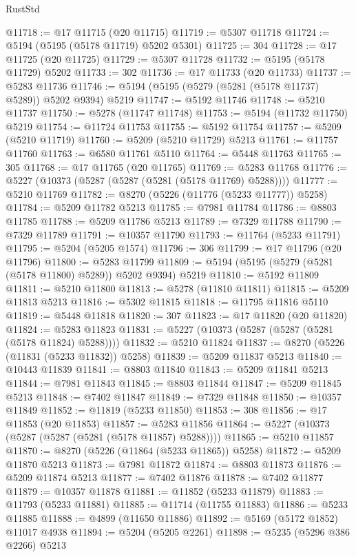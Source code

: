 \begin{lexlean}{RustStd}
\begin{coremodule}
@11718 := @17 @11715 (@20 @11715)
@11719 := @5307 @11718
@11724 := @5194 (@5195 (@5178 @11719) @5202 @5301)
@11725 := 304
@11728 := @17 @11725 (@20 @11725)
@11729 := @5307 @11728
@11732 := @5195 (@5178 @11729) @5202
@11733 := 302
@11736 := @17 @11733 (@20 @11733)
@11737 := @5283 @11736
@11746 := @5194 (@5195 (@5279 (@5281 (@5178 @11737) @5289)) @5202 @9394) @5219
@11747 := @5192 @11746
@11748 := @5210 @11737
@11750 := @5278 (@11747 @11748)
@11753 := @5194 (@11732 @11750) @5219
@11754 := @11724 @11753
@11755 := @5192 @11754
@11757 := @5209 (@5210 @11719)
@11760 := @5209 (@5210 @11729) @5213
@11761 := @11757 @11760
@11763 := @6580 @11761 @5110
@11764 := @5448 @11763
@11765 := 305
@11768 := @17 @11765 (@20 @11765)
@11769 := @5283 @11768
@11776 := @5227 (@10373 (@5287 (@5287 (@5281 (@5178 @11769) @5288))))
@11777 := @5210 @11769
@11782 := @8270 (@5226 (@11776 (@5233 @11777)) @5258)
@11784 := @5209 @11782 @5213
@11785 := @7981 @11784
@11786 := @8803 @11785
@11788 := @5209 @11786 @5213
@11789 := @7329 @11788
@11790 := @7329 @11789
@11791 := @10357 @11790
@11793 := @11764 (@5233 @11791)
@11795 := @5204 (@5205 @1574)
@11796 := 306
@11799 := @17 @11796 (@20 @11796)
@11800 := @5283 @11799
@11809 := @5194 (@5195 (@5279 (@5281 (@5178 @11800) @5289)) @5202 @9394) @5219
@11810 := @5192 @11809
@11811 := @5210 @11800
@11813 := @5278 (@11810 @11811)
@11815 := @5209 @11813 @5213
@11816 := @5302 @11815
@11818 := @11795 @11816 @5110
@11819 := @5448 @11818
@11820 := 307
@11823 := @17 @11820 (@20 @11820)
@11824 := @5283 @11823
@11831 := @5227 (@10373 (@5287 (@5287 (@5281 (@5178 @11824) @5288))))
@11832 := @5210 @11824
@11837 := @8270 (@5226 (@11831 (@5233 @11832)) @5258)
@11839 := @5209 @11837 @5213
@11840 := @10443 @11839
@11841 := @8803 @11840
@11843 := @5209 @11841 @5213
@11844 := @7981 @11843
@11845 := @8803 @11844
@11847 := @5209 @11845 @5213
@11848 := @7402 @11847
@11849 := @7329 @11848
@11850 := @10357 @11849
@11852 := @11819 (@5233 @11850)
@11853 := 308
@11856 := @17 @11853 (@20 @11853)
@11857 := @5283 @11856
@11864 := @5227 (@10373 (@5287 (@5287 (@5281 (@5178 @11857) @5288))))
@11865 := @5210 @11857
@11870 := @8270 (@5226 (@11864 (@5233 @11865)) @5258)
@11872 := @5209 @11870 @5213
@11873 := @7981 @11872
@11874 := @8803 @11873
@11876 := @5209 @11874 @5213
@11877 := @7402 @11876
@11878 := @7402 @11877
@11879 := @10357 @11878
@11881 := @11852 (@5233 @11879)
@11883 := @11793 (@5233 @11881)
@11885 := @11714 (@11755 @11883)
@11886 := @5233 @11885
@11888 := @4899 (@11650 @11886)
@11892 := @5169 (@5172 @1852) @11017 @4938
@11894 := @5204 (@5205 @2261)
@11898 := @5235 (@5296 @386 @2266) @5213

\end{coremodule}
\end{lexlean}

